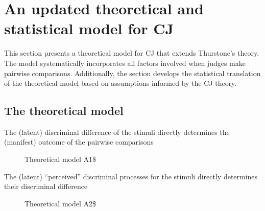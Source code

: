 \documentclass[
  authoryear,
  preprint,
  1p]{elsarticle}
\begin{document}
\section{An updated theoretical and statistical model for
CJ}\label{sec-theory}

This section presents a theoretical model for CJ that extends
Thurstone's theory. The model systematically incorporates all factors
involved when judges make pairwise comparisons. Additionally, the
section develops the statistical translation of the theoretical model
based on assumptions informed by the CJ theory.

\subsection{The theoretical model}\label{sec-theory-theoretical}

The (latent) discriminal difference of the stimuli directly determines
the (manifest) outcome of the pairwise comparisons

\begin{figure}


\caption{\label{fig-CJ_TM_A1}Theoretical model A1\$}

\end{figure}%

The (latent) ``perceived'' discriminal processes for the stimuli
directly determines their discriminal difference

\begin{figure}


\caption{\label{fig-CJ_TM_A2}Theoretical model A2\$}

\end{figure}%
\end{document}
